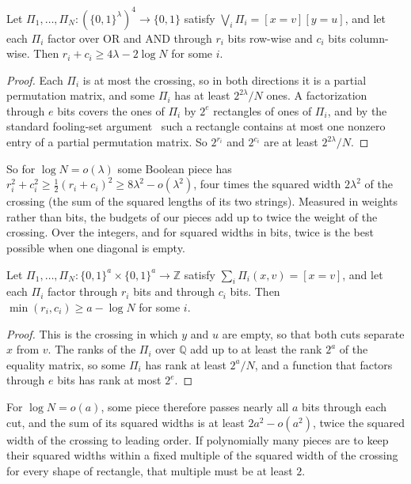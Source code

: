 \documentclass[11pt]{article}
\theoremstyle{definition}
\theoremstyle{definition}
\theoremstyle{remark}
\newcommand{\Z}{\mathbb{Z}}
\begin{document}
\begin{proposition}\label{prop:boolean}
Let $\Pi_1,\dots,\Pi_N\colon(\{0,1\}^\lambda)^4\to\{0,1\}$ satisfy $\bigvee_i\Pi_i=[x=v][y=u]$, and let each $\Pi_i$ factor over OR and AND through $r_i$ bits row-wise and $c_i$ bits column-wise. Then $r_i+c_i\ge4\lambda-2\log N$ for some $i$.
\end{proposition}

\begin{proof}
Each $\Pi_i$ is at most the crossing, so in both directions it is a partial permutation matrix, and some $\Pi_i$ has at least $2^{2\lambda}/N$ ones. A factorization through $e$ bits covers the ones of $\Pi_i$ by $2^e$ rectangles of ones of $\Pi_i$, and by the standard fooling-set argument~\cite{KN97} such a rectangle contains at most one nonzero entry of a partial permutation matrix. So $2^{r_i}$ and $2^{c_i}$ are at least $2^{2\lambda}/N$.
\end{proof}

So for $\log N=o(\lambda)$ some Boolean piece has $r_i^2+c_i^2\ge\frac12(r_i+c_i)^2\ge8\lambda^2-o(\lambda^2)$, four times the squared width $2\lambda^2$ of the crossing (the sum of the squared lengths of its two strings). Measured in weights rather than bits, the budgets of our pieces add up to twice the weight of the crossing. Over the integers, and for squared widths in bits, twice is the best possible when one diagonal is empty.

\begin{proposition}\label{prop:barrier}
Let $\Pi_1,\dots,\Pi_N\colon\{0,1\}^a\times\{0,1\}^a\to\Z$ satisfy $\sum_i\Pi_i(x,v)=[x=v]$, and let each $\Pi_i$ factor through $r_i$ bits and through $c_i$ bits. Then $\min(r_i,c_i)\ge a-\log N$ for some $i$.
\end{proposition}

\begin{proof}
This is the crossing in which $y$ and $u$ are empty, so that both cuts separate $x$ from $v$. The ranks of the $\Pi_i$ over $\mathbb Q$ add up to at least the rank $2^a$ of the equality matrix, so some $\Pi_i$ has rank at least $2^a/N$, and a function that factors through $e$ bits has rank at most $2^e$.
\end{proof}

For $\log N=o(a)$, some piece therefore passes nearly all $a$ bits through each cut, and the sum of its squared widths is at least $2a^2-o(a^2)$, twice the squared width of the crossing to leading order. If polynomially many pieces are to keep their squared widths within a fixed multiple of the squared width of the crossing for every shape of rectangle, that multiple must be at least $2$.
\end{document}
